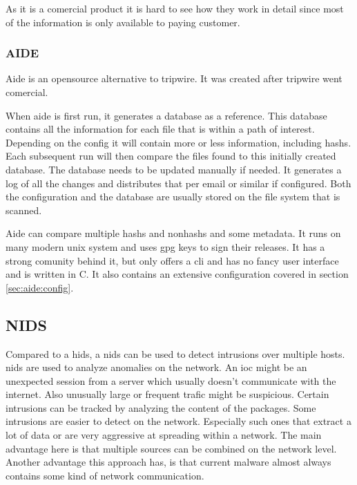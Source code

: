 \documentclass[
	a4paper,					%
	10pt,							%
	twoside,					%
	openright,				%
	notitlepage,			%
	parskip=half,			%
]{scrreprt}					%
\begin{document}
As it is a comercial product it is hard to see how they work in detail since most of the information is only available to paying customer. 

\subsubsection{AIDE}
\label{sec:aide}

Aide is an \gls{opensource} alternative to tripwire. It was created after tripwire went comercial. \cite{aide:totherescue, aide:github}

When aide is first run, it generates a database as a reference. This database contains all the information for each file that is within a path of interest. Depending on the config it will contain more or less information, including \glspl{hash}. Each subsequent run will then compare the files found to this initially created database. The database needs to be updated manually if needed. It generates a log of all the changes and distributes that per email or similar if configured. Both the configuration and the database are usually stored on the file system that is scanned. \cite{aide, aide:doc}

Aide can compare multiple \glspl{hash} and \glspl{nonhash} and some \gls{metadata}. It runs on many modern unix system \cite{aide} and uses gpg keys to sign their releases. It has a strong comunity behind it, but only offers a \gls{cli} and has no fancy user interface and is written in C. \cite{aide:github} It also contains an extensive configuration covered in section \ref{sec:aide:config}.


\subsection{NIDS}
\label{sec:def:nids}

Compared to a \gls{hids}, a \gls{nids} can be used to detect intrusions over multiple hosts. \gls{nids} are used to analyze anomalies on the network. An \gls{ioc}	might be an unexpected session from a server which usually doesn't communicate with the internet. Also unusually large or frequent trafic might be suspicious. Certain intrusions can be tracked by analyzing the content of the packages. Some intrusions are easier to detect on the network. Especially such ones that extract a lot of data or are very aggressive at spreading within a network. The main advantage here is that multiple sources can be combined on the network level. Another advantage this approach has, is that current \gls{malware} almost always contains some kind of network communication. \cite{Malware:Behaviour,nids}
\end{document}
